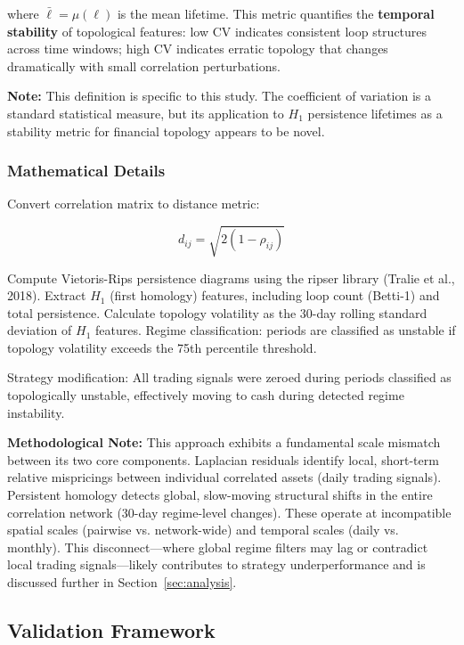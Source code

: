 where $\bar{\ell} = \mu(\ell)$ is the mean lifetime. This metric quantifies the \textbf{temporal stability} of topological features: low CV indicates consistent loop structures across time windows; high CV indicates erratic topology that changes dramatically with small correlation perturbations.

\textbf{Note:} This definition is specific to this study. The coefficient of variation is a standard statistical measure, but its application to $H_1$ persistence lifetimes as a stability metric for financial topology appears to be novel.

\subsubsection{Mathematical Details}

Convert correlation matrix to distance metric:

\begin{equation}
d_{ij} = \sqrt{2(1 - \rho_{ij})}
\end{equation}

Compute Vietoris-Rips persistence diagrams using the ripser library (Tralie et al., 2018). Extract $H_1$ (first homology) features, including loop count (Betti-1) and total persistence. Calculate topology volatility as the 30-day rolling standard deviation of $H_1$ features. Regime classification: periods are classified as unstable if topology volatility exceeds the 75th percentile threshold.

Strategy modification: All trading signals were zeroed during periods classified as topologically unstable, effectively moving to cash during detected regime instability.

\textbf{Methodological Note:} This approach exhibits a fundamental scale mismatch between its two core components. Laplacian residuals identify local, short-term relative mispricings between individual correlated assets (daily trading signals). Persistent homology detects global, slow-moving structural shifts in the entire correlation network (30-day regime-level changes). These operate at incompatible spatial scales (pairwise vs. network-wide) and temporal scales (daily vs. monthly). This disconnect---where global regime filters may lag or contradict local trading signals---likely contributes to strategy underperformance and is discussed further in Section~\ref{sec:analysis}.

\subsection{Validation Framework}

